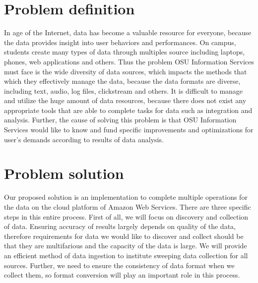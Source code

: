 \documentclass[letterpaper,10pt]{article}
\begin{document}
	\section{Problem definition}
    In age of the Internet, data has become a valuable resource for everyone, because the data provides insight into user behaviors and performances. On campus, students create many types of data through multiples source including laptops, phones, web applications and others. Thus the problem OSU Information Services must face is the wide diversity of data sources, which impacts the methods that which they effectively manage the data, because the data formats are diverse, including text, audio, log files, clickstream and others. It is difficult to manage and utilize the huge amount of data resources, because there does not exist any appropriate tools that are able to complete tasks for data such as integration and analysis. Further, the cause of solving this problem is that OSU Information Services would like to know and fund specific improvements and optimizations for user’s demands according to results of data analysis.

	\section{Problem solution}
	Our proposed solution is an implementation to complete multiple operations for the data on the cloud platform of Amazon Web Services. There are three specific steps in this entire process. First of all, we will focus on discovery and collection of data. Ensuring accuracy of results largely depends on quality of the data, therefore requirements for data we would like to discover and collect should be that they are multifarious and the capacity of the data is large. We will provide an efficient method of data ingestion to institute sweeping data collection for all sources. Further, we need to ensure the consistency of data format when we collect them, so format conversion will play an important role in this process.\\ 
\end{document}
